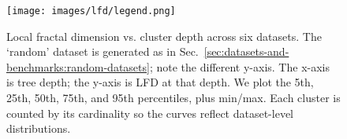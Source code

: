 \begin{figure}[t]
    \centering
    \hfill

    \par\medskip
    \hfill

    \par\medskip
    \hfill

    \par\smallskip
    \texttt{[image: images/lfd/legend.png]}

    \caption{Local fractal dimension vs. cluster depth across six datasets. The ‘random’ dataset is generated as in Sec.~\ref{sec:datasets-and-benchmarks:random-datasets}; note the different y-axis. The x-axis is tree depth; the y-axis is LFD at that depth. We plot the 5th, 25th, 50th, 75th, and 95th percentiles, plus min/max. Each cluster is counted by its cardinality so the curves reflect dataset-level distributions.}
    \label{fig:results:lfd-plots}
  \end{figure}




